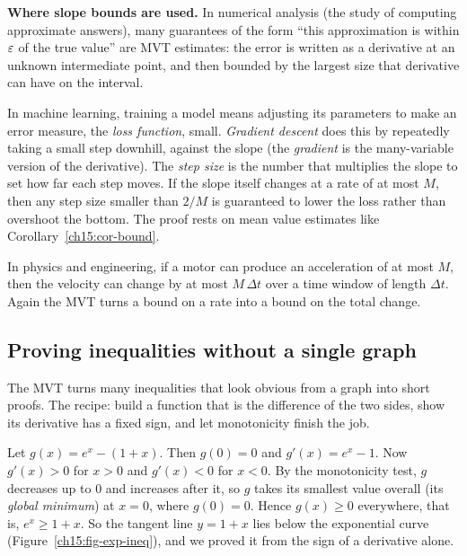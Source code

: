 \begin{applicationbox}
\textbf{Where slope bounds are used.}
In numerical analysis (the study of computing approximate answers), many guarantees of
the form ``this approximation is within $\varepsilon$ of the true value'' are MVT estimates:
the error is written as a derivative at an unknown intermediate point, and then
bounded by the largest size that derivative can have on the interval.

In machine learning, training a model means adjusting its parameters to make an error
measure, the \emph{loss function}, small. \emph{Gradient descent} does this by
repeatedly taking a small step downhill, against the slope (the \emph{gradient} is the
many-variable version of the derivative). The \emph{step size} is the number that
multiplies the slope to set how far each step moves. If the slope itself changes at a rate of at
most $M$, then any step size smaller than $2/M$ is guaranteed to lower the loss rather
than overshoot the bottom. The proof rests on mean value estimates like
Corollary~\ref{ch15:cor-bound}.

In physics and engineering, if a motor can produce an acceleration of at most $M$,
then the velocity can change by at most $M\,\Delta t$ over a time window of length
$\Delta t$. Again the MVT turns a bound on a rate into a bound on the total change.
\end{applicationbox}

\subsection{Proving inequalities without a single graph}

The MVT turns many inequalities that look obvious from a graph into short
proofs. The recipe: build a function that is the difference of the two sides, show
its derivative has a fixed sign, and let monotonicity finish the job.

\begin{example}\label{ch15:ex-exp-ineq}
Let $g(x)=e^x-(1+x)$. Then $g(0)=0$ and $g'(x)=e^x-1$. Now $g'(x)>0$ for $x>0$ and
$g'(x)<0$ for $x<0$. By the monotonicity test, $g$ decreases up to $0$ and
increases after it, so $g$ takes its smallest value overall (its \emph{global
minimum}) at $x=0$, where $g(0)=0$. Hence
$g(x)\ge 0$ everywhere, that is, $e^x\ge 1+x$. So the tangent line $y=1+x$ lies below the
exponential curve (Figure~\ref{ch15:fig-exp-ineq}), and we proved it from the sign of a
derivative alone.
\end{example}

